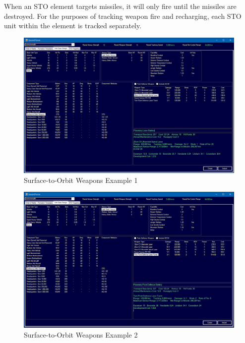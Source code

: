 \documentclass[../../Aurora C# unofficial manual.tex]{subfiles}
\begin{document}
	When an STO element targets missiles, it will only fire until the missiles are destroyed. For the purposes of tracking weapon fire and recharging, each STO unit within the element is tracked separately.
	\begin{figure}[H]
		\centering
		\includegraphics[width=0.95\linewidth]{images/STOWeapons}
		\caption[STO Weapons]{Surface-to-Orbit Weapons Example 1}
		\label{fig:stoweapons}
	\end{figure}
	\begin{figure}[H]
		\centering
		\includegraphics[width=0.95\linewidth]{images/STOWeapons2}
		\caption[STO Weapons]{Surface-to-Orbit Weapons Example 2}
		\label{fig:stoweapons2}
	\end{figure}
\end{document}
